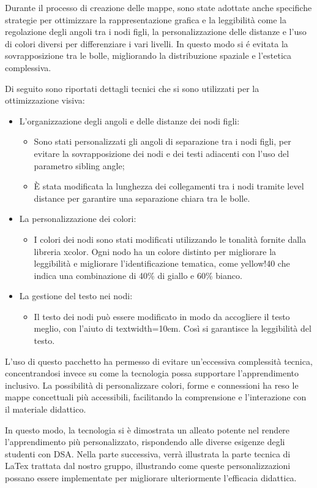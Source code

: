 \documentclass[portrait,a4paper]{article} %
\begin{document}
Durante il processo di creazione delle mappe, sono state adottate anche specifiche strategie per ottimizzare la rappresentazione grafica e la leggibilità come la regolazione degli angoli tra i nodi figli, la personalizzazione delle distanze e l’uso di colori diversi per differenziare i vari livelli. In questo modo si \'{e} evitata la sovrapposizione tra le bolle, migliorando la distribuzione spaziale e l’estetica complessiva. 
\par
Di seguito sono riportati dettagli tecnici che si sono utilizzati per la ottimizzazione visiva:
\begin{itemize} 
    \item L’organizzazione degli angoli e delle distanze dei nodi figli:
        \begin{itemize}
            \item Sono stati personalizzati gli angoli di separazione tra i nodi figli, per evitare la sovrapposizione dei nodi e dei testi adiacenti con l’uso del parametro sibling angle;
            \item È stata modificata la lunghezza dei collegamenti tra i nodi tramite level distance per garantire una separazione chiara tra le bolle.
        \end{itemize}
    \item La personalizzazione dei colori:
        \begin{itemize}
            \item I colori dei nodi sono stati modificati utilizzando le tonalità fornite dalla libreria xcolor. Ogni nodo ha un colore distinto per migliorare la leggibilità e migliorare l’identificazione tematica, come yellow!40 che indica una combinazione di 40\% di giallo e 60\% bianco.
        \end{itemize}
    \item La gestione del testo nei nodi:
        \begin{itemize}
            \item Il testo dei nodi può essere modificato in modo da accogliere il testo meglio, con l’aiuto di textwidth=10em. Così si garantisce la leggibilità del testo.
        \end{itemize}
\end{itemize}
L'uso di questo pacchetto ha permesso di evitare un'eccessiva complessità tecnica, concentrandosi invece su come la tecnologia possa supportare l'apprendimento inclusivo. La possibilità di personalizzare colori, forme e connessioni ha reso le mappe concettuali più accessibili, facilitando la comprensione e l'interazione con il materiale didattico.
\par
In questo modo, la tecnologia si è dimostrata un alleato potente nel rendere l'apprendimento più personalizzato, rispondendo alle diverse esigenze degli studenti con DSA. 
Nella parte successiva, verrà illustrata la parte tecnica di LaTex trattata dal nostro gruppo, illustrando come queste personalizzazioni possano essere implementate per migliorare ulteriormente l'efficacia didattica.
\end{document}
